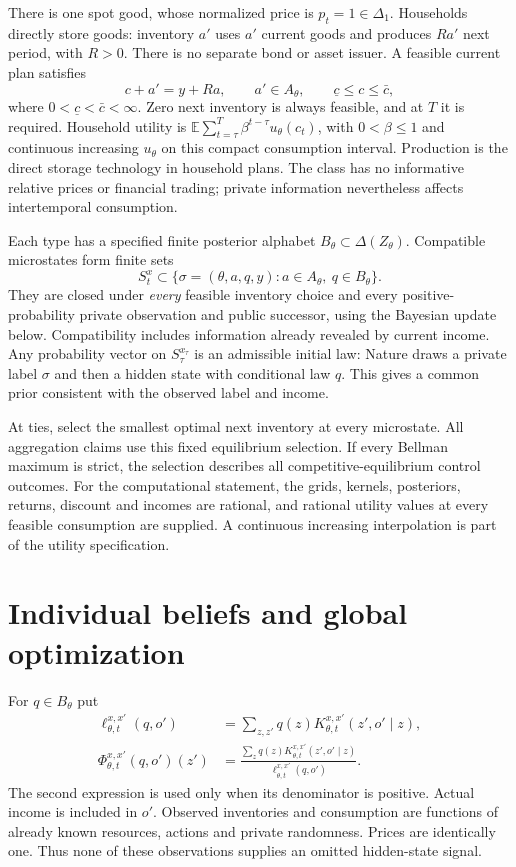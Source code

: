 \documentclass[11pt]{article}
\newcommand{\E}{\mathbb E}
\begin{document}
There is one spot good, whose normalized price is $p_t=1\in\Delta_1$. Households directly store goods: inventory $a'$ uses $a'$ current goods and produces $Ra'$ next period, with $R>0$. There is no separate bond or asset issuer. A feasible current plan satisfies
\begin{equation}\label{budget}
 c+a'=y+Ra,\qquad a'\in A_\theta,\qquad
 \underline c\le c\le\bar c,
\end{equation}
where $0<\underline c<\bar c<\infty$. Zero next inventory is always feasible, and at $T$ it is required. Household utility is $\E\sum_{t=\tau}^T\beta^{t-\tau}u_\theta(c_t)$, with $0<\beta\le1$ and continuous increasing $u_\theta$ on this compact consumption interval. Production is the direct storage technology in household plans. The class has no informative relative prices or financial trading; private information nevertheless affects intertemporal consumption.

Each type has a specified finite posterior alphabet $B_\theta\subset\Delta(Z_\theta)$. Compatible microstates form finite sets
\[
 S_t^x\subset\{\sigma=(\theta,a,q,y):a\in A_\theta,\ q\in B_\theta\}.
\]
They are closed under \emph{every} feasible inventory choice and every positive-probability private observation and public successor, using the Bayesian update below. Compatibility includes information already revealed by current income. Any probability vector on $S_\tau^{x_\tau}$ is an admissible initial law: Nature draws a private label $\sigma$ and then a hidden state with conditional law $q$. This gives a common prior consistent with the observed label and income.

At ties, select the smallest optimal next inventory at every microstate. All aggregation claims use this fixed equilibrium selection. If every Bellman maximum is strict, the selection describes all competitive-equilibrium control outcomes. For the computational statement, the grids, kernels, posteriors, returns, discount and incomes are rational, and rational utility values at every feasible consumption are supplied. A continuous increasing interpolation is part of the utility specification.

\section{Individual beliefs and global optimization}
For $q\in B_\theta$ put
\begin{align}
 \ell^{x,x'}_{\theta,t}(q,o')
 &=\sum_{z,z'}q(z)K^{x,x'}_{\theta,t}(z',o'\mid z),\label{likelihood}\\
 \Phi^{x,x'}_{\theta,t}(q,o')(z')
 &=\frac{\sum_zq(z)K^{x,x'}_{\theta,t}(z',o'\mid z)}
               {\ell^{x,x'}_{\theta,t}(q,o')}.\label{filter}
\end{align}
The second expression is used only when its denominator is positive. Actual income is included in $o'$. Observed inventories and consumption are functions of already known resources, actions and private randomness. Prices are identically one. Thus none of these observations supplies an omitted hidden-state signal.
\end{document}
